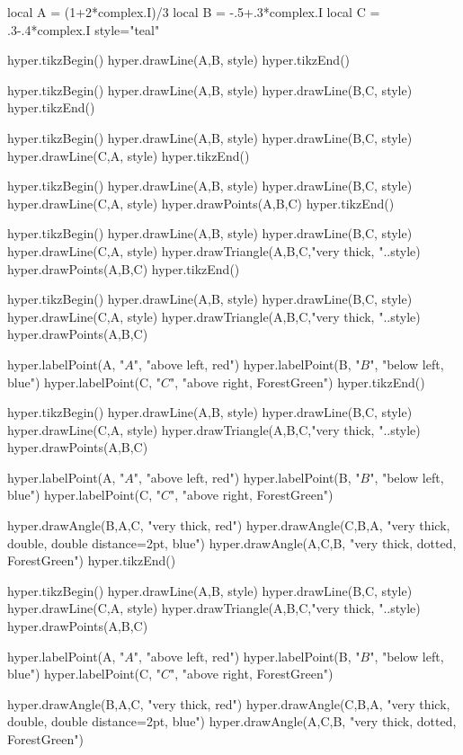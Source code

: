 \documentclass[margin=.2cm,multi,tikz]{standalone}
\begin{document}
\begin{luacode*}
local A = (1+2*complex.I)/3
local B = -.5+.3*complex.I
local C = .3-.4*complex.I
style="teal"

hyper.tikzBegin()
hyper.drawLine(A,B, style)
hyper.tikzEnd()

hyper.tikzBegin()
hyper.drawLine(A,B, style)
hyper.drawLine(B,C, style)
hyper.tikzEnd()

hyper.tikzBegin()
hyper.drawLine(A,B, style)
hyper.drawLine(B,C, style)
hyper.drawLine(C,A, style)
hyper.tikzEnd()

hyper.tikzBegin()
hyper.drawLine(A,B, style)
hyper.drawLine(B,C, style)
hyper.drawLine(C,A, style)
hyper.drawPoints(A,B,C)
hyper.tikzEnd()


hyper.tikzBegin()
hyper.drawLine(A,B, style)
hyper.drawLine(B,C, style)
hyper.drawLine(C,A, style)
hyper.drawTriangle(A,B,C,"very thick, "..style)
hyper.drawPoints(A,B,C)
hyper.tikzEnd()

hyper.tikzBegin()
hyper.drawLine(A,B, style)
hyper.drawLine(B,C, style)
hyper.drawLine(C,A, style)
hyper.drawTriangle(A,B,C,"very thick, "..style)
hyper.drawPoints(A,B,C)

hyper.labelPoint(A, "$A$", "above left, red")
hyper.labelPoint(B, "$B$", "below left, blue")
hyper.labelPoint(C, "$C$", "above right, ForestGreen")
hyper.tikzEnd()

hyper.tikzBegin()
hyper.drawLine(A,B, style)
hyper.drawLine(B,C, style)
hyper.drawLine(C,A, style)
hyper.drawTriangle(A,B,C,"very thick, "..style)
hyper.drawPoints(A,B,C)

hyper.labelPoint(A, "$A$", "above left, red")
hyper.labelPoint(B, "$B$", "below left, blue")
hyper.labelPoint(C, "$C$", "above right, ForestGreen")


hyper.drawAngle(B,A,C, "very thick, red")
hyper.drawAngle(C,B,A, "very thick, double, double distance=2pt, blue")
hyper.drawAngle(A,C,B, "very thick, dotted, ForestGreen")
hyper.tikzEnd()

hyper.tikzBegin()
hyper.drawLine(A,B, style)
hyper.drawLine(B,C, style)
hyper.drawLine(C,A, style)
hyper.drawTriangle(A,B,C,"very thick, "..style)
hyper.drawPoints(A,B,C)

hyper.labelPoint(A, "$A$", "above left, red")
hyper.labelPoint(B, "$B$", "below left, blue")
hyper.labelPoint(C, "$C$", "above right, ForestGreen")

hyper.drawAngle(B,A,C, "very thick, red")
hyper.drawAngle(C,B,A, "very thick, double, double distance=2pt, blue")
hyper.drawAngle(A,C,B, "very thick, dotted, ForestGreen")


\end{luacode*}
\end{document}
